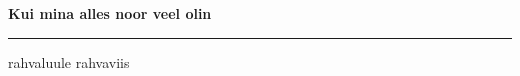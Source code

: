 \documentclass[10pt]{book}
\begin{document}
{
  \samepage
  \raggedbottom
  \raggedright
  \sloppy


  \vspace{0.2in}

  \noindent\begin{minipage}{.1\textwidth}
    \hfill\vspace{0.1in}
  \end{minipage}%
  \noindent\begin{minipage}{.8\textwidth}
    \centering
    \bfseries
    \large Kui mina alles noor veel olin
  \end{minipage}%
  \noindent\begin{minipage}{.1\textwidth}
      \hfill\vspace{0.1in}
  \end{minipage}

  \nopagebreak[4]
  \vspace{0.1in}
  \nopagebreak[4]
  \hrule height 0.05ex
  \nopagebreak[4]
  \vspace{-0.05in}

  {\footnotesize rahvaluule \hfill rahvaviis }\\
  \vspace{0.01in}



}
\end{document}

